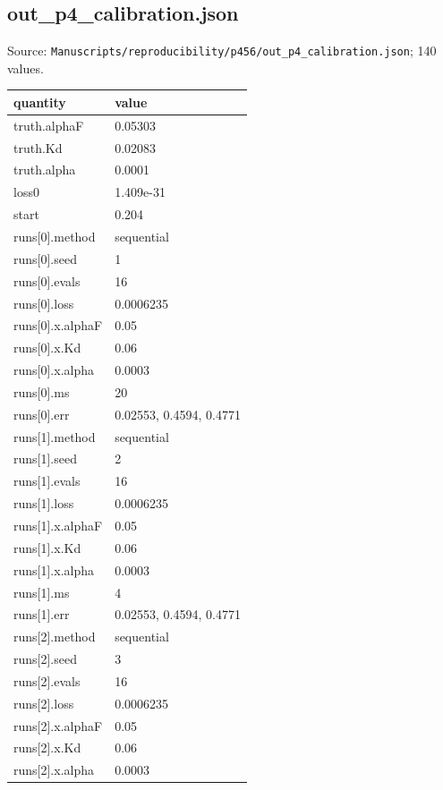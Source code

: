 \subsection*{out\_p4\_calibration.json}
\noindent\small Source: \nolinkurl{Manuscripts/reproducibility/p456/out_p4_calibration.json}; 140 values.\par
{\scriptsize\begin{longtable}{p{}p{}}\toprule\textbf{quantity} & \textbf{value}\\\midrule\endhead
{}truth.alphaF & 0.05303\\
{}truth.Kd & 0.02083\\
{}truth.alpha & 0.0001\\
{}loss0 & 1.409e-31\\
{}start & 0.204\\
{}runs[0].method & sequential\\
{}runs[0].seed & 1\\
{}runs[0].evals & 16\\
{}runs[0].loss & 0.0006235\\
{}runs[0].x.alphaF & 0.05\\
{}runs[0].x.Kd & 0.06\\
{}runs[0].x.alpha & 0.0003\\
{}runs[0].ms & 20\\
{}runs[0].err & 0.02553, 0.4594, 0.4771\\
{}runs[1].method & sequential\\
{}runs[1].seed & 2\\
{}runs[1].evals & 16\\
{}runs[1].loss & 0.0006235\\
{}runs[1].x.alphaF & 0.05\\
{}runs[1].x.Kd & 0.06\\
{}runs[1].x.alpha & 0.0003\\
{}runs[1].ms & 4\\
{}runs[1].err & 0.02553, 0.4594, 0.4771\\
{}runs[2].method & sequential\\
{}runs[2].seed & 3\\
{}runs[2].evals & 16\\
{}runs[2].loss & 0.0006235\\
{}runs[2].x.alphaF & 0.05\\
{}runs[2].x.Kd & 0.06\\
{}runs[2].x.alpha & 0.0003\\

\end{longtable}}
